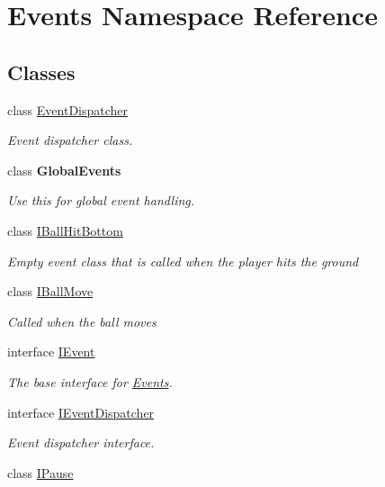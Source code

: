\hypertarget{namespace_events}{}\section{Events Namespace Reference}
\label{namespace_events}
\subsection*{Classes}
\begin{DoxyCompactItemize}
\item 
class \hyperlink{class_events_1_1_event_dispatcher}{Event\+Dispatcher}
\begin{DoxyCompactList}\small\item\em Event dispatcher class. \end{DoxyCompactList}\item 
class {\bfseries Global\+Events}
\begin{DoxyCompactList}\small\item\em Use this for global event handling. \end{DoxyCompactList}\item 
class \hyperlink{class_events_1_1_i_ball_hit_bottom}{I\+Ball\+Hit\+Bottom}
\begin{DoxyCompactList}\small\item\em Empty event class that is called when the player hits the ground \end{DoxyCompactList}\item 
class \hyperlink{class_events_1_1_i_ball_move}{I\+Ball\+Move}
\begin{DoxyCompactList}\small\item\em Called when the ball moves \end{DoxyCompactList}\item 
interface \hyperlink{interface_events_1_1_i_event}{I\+Event}
\begin{DoxyCompactList}\small\item\em The base interface for \hyperlink{namespace_events}{Events}. \end{DoxyCompactList}\item 
interface \hyperlink{interface_events_1_1_i_event_dispatcher}{I\+Event\+Dispatcher}
\begin{DoxyCompactList}\small\item\em Event dispatcher interface. \end{DoxyCompactList}\item 
class \hyperlink{class_events_1_1_i_pause}{I\+Pause}

\end{DoxyCompactItemize}
